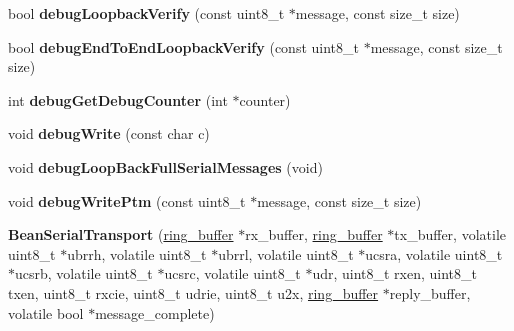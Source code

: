 \begin{DoxyCompactItemize}
\item 
\hypertarget{class_bean_serial_transport_a7b3c0404cc0e831080ee8401ef1cf69f}{}bool {\bfseries debug\+Loopback\+Verify} (const uint8\+\_\+t $\ast$message, const size\+\_\+t size)\label{class_bean_serial_transport_a7b3c0404cc0e831080ee8401ef1cf69f}

\item 
\hypertarget{class_bean_serial_transport_a62fd1843ed294c6bcd716f1a1fe10583}{}bool {\bfseries debug\+End\+To\+End\+Loopback\+Verify} (const uint8\+\_\+t $\ast$message, const size\+\_\+t size)\label{class_bean_serial_transport_a62fd1843ed294c6bcd716f1a1fe10583}

\item 
\hypertarget{class_bean_serial_transport_ab0cb4df1e973b022620b006f2fb9d94b}{}int {\bfseries debug\+Get\+Debug\+Counter} (int $\ast$counter)\label{class_bean_serial_transport_ab0cb4df1e973b022620b006f2fb9d94b}

\item 
\hypertarget{class_bean_serial_transport_aa1580451f14a5e0dc0dfd7cae746f091}{}void {\bfseries debug\+Write} (const char c)\label{class_bean_serial_transport_aa1580451f14a5e0dc0dfd7cae746f091}

\item 
\hypertarget{class_bean_serial_transport_a65c6dc7a8c8c0be968323e46239f0c3b}{}void {\bfseries debug\+Loop\+Back\+Full\+Serial\+Messages} (void)\label{class_bean_serial_transport_a65c6dc7a8c8c0be968323e46239f0c3b}

\item 
\hypertarget{class_bean_serial_transport_a06cf51d3476b22b48eaf3c70eaabc231}{}void {\bfseries debug\+Write\+Ptm} (const uint8\+\_\+t $\ast$message, const size\+\_\+t size)\label{class_bean_serial_transport_a06cf51d3476b22b48eaf3c70eaabc231}

\item 
\hypertarget{class_bean_serial_transport_a5dc7f546043c49b40f6defdca358175f}{}{\bfseries Bean\+Serial\+Transport} (\hyperlink{structring__buffer}{ring\+\_\+buffer} $\ast$rx\+\_\+buffer, \hyperlink{structring__buffer}{ring\+\_\+buffer} $\ast$tx\+\_\+buffer, volatile uint8\+\_\+t $\ast$ubrrh, volatile uint8\+\_\+t $\ast$ubrrl, volatile uint8\+\_\+t $\ast$ucsra, volatile uint8\+\_\+t $\ast$ucsrb, volatile uint8\+\_\+t $\ast$ucsrc, volatile uint8\+\_\+t $\ast$udr, uint8\+\_\+t rxen, uint8\+\_\+t txen, uint8\+\_\+t rxcie, uint8\+\_\+t udrie, uint8\+\_\+t u2x, \hyperlink{structring__buffer}{ring\+\_\+buffer} $\ast$reply\+\_\+buffer, volatile bool $\ast$message\+\_\+complete)\label{class_bean_serial_transport_a5dc7f546043c49b40f6defdca358175f}

\end{DoxyCompactItemize}
